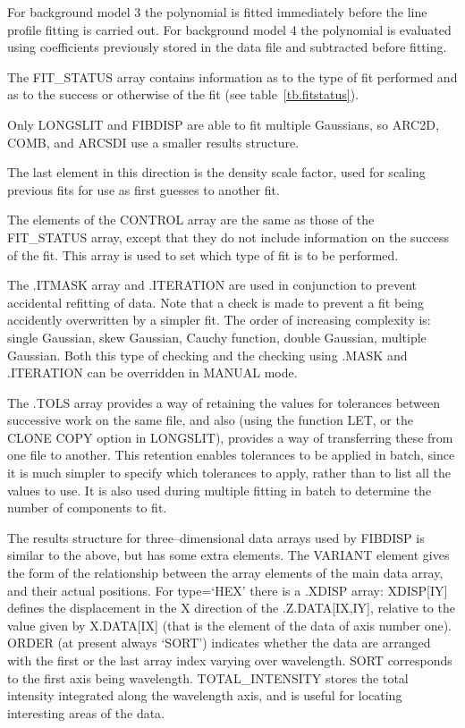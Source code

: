\normalsize
For background model 3 the polynomial is fitted immediately before the
line profile fitting is carried out.
For background model 4 the polynomial is evaluated using coefficients
previously stored in the data file and subtracted before fitting.


The FIT\_STATUS array contains information as to the type of fit
performed and as to the success or otherwise of the fit (see
table~\ref{tb.fitstatus}).

Only LONGSLIT and FIBDISP are able to fit multiple Gaussians, so ARC2D,
COMB, and ARCSDI use a smaller results structure.

The last element in this direction is the density scale factor, used for
scaling previous fits for use as first guesses to another fit.

The elements of the CONTROL array are the same as those of the
FIT\_STATUS array, except that they do not include information on the
success of the fit.
This array is used to set which type of fit is to be performed.

The .ITMASK array and .ITERATION are used in conjunction to prevent
accidental refitting of data.
Note that a check is made to prevent a fit being accidently
overwritten by a simpler fit.
The order of increasing complexity is: single Gaussian, skew
Gaussian, Cauchy function, double Gaussian, multiple Gaussian.
Both this type of checking and the checking using .MASK and .ITERATION
can be overridden in MANUAL mode.

The .TOLS array provides a way of retaining the values for tolerances
between successive work on the same file, and also (using the 
function LET, or the CLONE COPY option in LONGSLIT), provides a way of
transferring these from one file to another.
This retention enables tolerances to be applied in batch, since it is
much simpler to specify which tolerances to apply, rather than to list
all the values to use.
It is also used during multiple fitting in batch to determine the number
of components to fit.

The results structure for three--dimensional data arrays used by FIBDISP
is similar to the above, but has some extra elements.
The VARIANT element gives the form of the relationship between the array
elements of the main data array, and their actual positions.
For type=`HEX' there is a .XDISP array: XDISP[IY] defines the
displacement in the X direction of the .Z.DATA[IX,IY], relative to the
value given by X.DATA[IX] (that is the element of the data of axis
number one).
ORDER (at present always `SORT') indicates whether the data are
arranged with the first or the last array index varying over wavelength.
SORT corresponds to the first axis being wavelength.
TOTAL\_INTENSITY stores the total intensity integrated along the
wavelength axis, and is useful for locating interesting areas of the
data.



